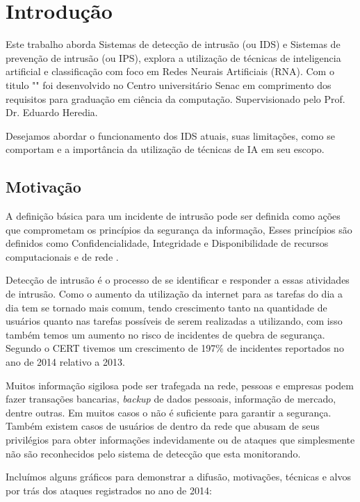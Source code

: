 
\chapter[Introdução]{Introdução}
Este trabalho aborda Sistemas de detecção de intrusão (\monoIDS ou IDS) e Sistemas de prevenção de intrusão (\monoIPS ou IPS), explora a utilização de técnicas de inteligencia artificial e classificação com foco em Redes Neurais Artificiais (RNA). Com o titulo "\monoTitulo"  foi desenvolvido no Centro universitário Senac em comprimento dos requisitos para graduação em ciência da computação. Supervisionado pelo Prof. Dr. Eduardo Heredia.

Desejamos abordar o funcionamento dos IDS atuais, suas limitações, como se comportam e a importância da utilização de técnicas de IA em seu escopo.
	
\section{Motivação}

A definição básica para um incidente de intrusão pode ser definida como ações que comprometam os princípios da segurança da informação, Esses princípios são definidos como Confidencialidade, Integridade e Disponibilidade de recursos computacionais e de rede \cite{whitman2011principles}. 

Detecção de intrusão é o processo de se identificar e responder a essas atividades de intrusão. Como o aumento da utilização da internet para  as tarefas do dia a dia tem se tornado mais comum, tendo crescimento tanto na quantidade de usuários quanto nas tarefas possíveis de serem realizadas a utilizando, com isso também temos um aumento no risco de incidentes de quebra de segurança. Segundo o CERT \cite{CERT} tivemos um crescimento de 197\% de incidentes reportados no ano de 2014 relativo a 2013. 

Muitos informação sigilosa pode ser trafegada na rede, pessoas e empresas podem fazer transações bancarias, \textit{backup} de dados pessoais, informação de mercado, dentre outras. Em muitos casos o \monoFireWall não é suficiente para garantir a segurança. Também existem casos de usuários de dentro da rede que abusam de seus privilégios para obter informações indevidamente ou de ataques que simplesmente não são reconhecidos pelo sistema de detecção que esta monitorando.

Incluímos alguns gráficos para demonstrar a difusão, motivações, técnicas e alvos por trás dos ataques registrados no ano de 2014:



